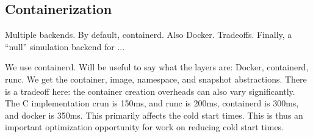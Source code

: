 \subsection{Containerization}

Multiple backends. By default, containerd. Also Docker.
Tradeoffs.
Finally, a ``null'' simulation backend for ...

We use containerd. Will be useful to say what the layers are: Docker, containerd, runc.
We get the container, image, namespace, and snapshot abstractions.
There is a tradeoff here: the container creation overheads can also vary significantly. The C implementation crun is 150ms, and runc is 200ms, containerd is 300ms, and docker is 350ms. This primarily affects the cold start times. This is thus an important optimization opportunity for work on reducing cold start times.

